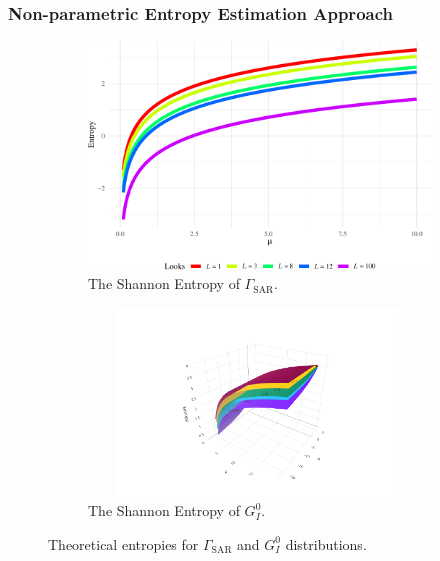 \documentclass[aspectratio=1610,10pt]{beamer}
\begin{document}
\begin{frame} \frametitle{\large{Non-parametric Entropy Estimation Approach}}\vspace{0.4cm}	

 \justifying
\begin{figure}[htb]
  \centering
  \begin{subfigure}[b]{0.3\textwidth}
    \centering
    \includegraphics[width=1.5\textwidth]{../../Figures/PDF/PlotGammaSAR-1}
    \caption{The Shannon Entropy of $\Gamma_{\text{SAR}}$.}
    \label{fig:H1}
  \end{subfigure}
  \hfill
  \begin{subfigure}[b]{0.5\textwidth}
    \centering
    \includegraphics[width=9cm, height=5cm]{../../Figures/PDF/3d_lab}
    \caption{The Shannon Entropy of $G_I^0$.}
    \label{fig:H2}
  \end{subfigure}
  \caption{Theoretical entropies for $\Gamma_{\text{SAR}}$ and $G_I^0$ distributions.}
  \label{fig:all_H}
\end{figure}

\end{frame} 
\end{document}
